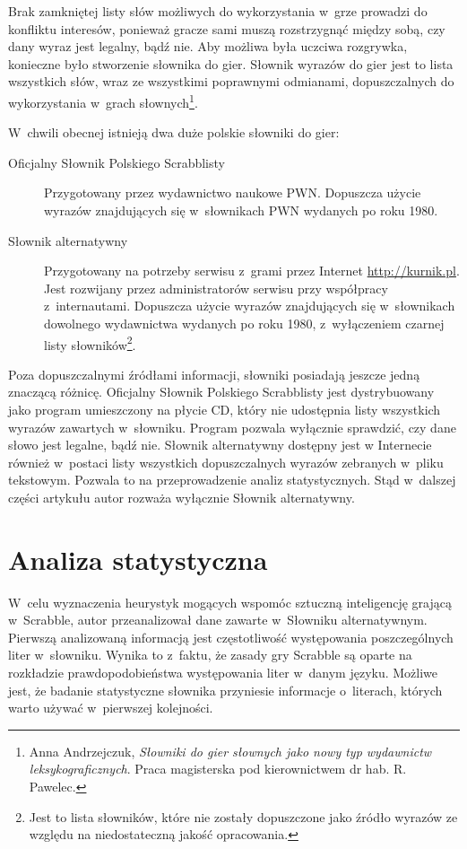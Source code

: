 \documentclass[a4paper,twocolumn,12pt]{article}
\begin{document}
Brak zamkniętej listy słów możliwych do wykorzystania w~grze prowadzi do konfliktu interesów, ponieważ gracze sami muszą rozstrzygnąć między sobą, czy dany wyraz jest legalny, bądź nie. Aby możliwa była uczciwa rozgrywka, konieczne było stworzenie słownika do gier. Słownik wyrazów do gier jest to lista wszystkich słów, wraz ze wszystkimi poprawnymi odmianami, dopuszczalnych do wykorzystania w~grach słownych\footnote{Anna Andrzejczuk, \emph{Słowniki do gier słownych jako nowy typ wydawnictw leksykograficznych}. Praca magisterska pod kierownictwem dr hab. R. Pawelec.}.

W~chwili obecnej istnieją dwa duże polskie słowniki do gier:

\begin{description}
 \item [Oficjalny Słownik Polskiego Scrabblisty] Przygotowany przez wydawnictwo naukowe PWN. Dopuszcza użycie wyrazów znajdujących się w~słownikach PWN wydanych po roku 1980.
 \item[Słownik alternatywny] Przygotowany na potrzeby serwisu z~grami przez Internet \url{http://kurnik.pl}. Jest rozwijany przez administratorów serwisu przy współpracy z~internautami. Dopuszcza użycie wyrazów znajdujących się w~słownikach dowolnego wydawnictwa wydanych po roku 1980, z~wyłączeniem czarnej listy słowników\footnote{Jest to lista słowników, które nie zostały dopuszczone jako źródło wyrazów ze względu na niedostateczną jakość opracowania.}. 
\end{description}

Poza dopuszczalnymi źródłami informacji, słowniki posiadają jeszcze jedną znaczącą różnicę. Oficjalny Słownik Polskiego Scrabblisty jest dystrybuowany jako program umieszczony na płycie CD, który nie udostępnia listy wszystkich wyrazów zawartych w~słowniku. Program pozwala wyłącznie sprawdzić, czy dane słowo jest legalne, bądź nie. Słownik alternatywny dostępny jest w Internecie również w~postaci listy wszystkich dopuszczalnych wyrazów zebranych w~pliku tekstowym. Pozwala to na przeprowadzenie analiz statystycznych. Stąd w~dalszej części artykułu autor rozważa wyłącznie Słownik alternatywny.

\section*{Analiza statystyczna}

W~celu wyznaczenia heurystyk mogących wspomóc sztuczną inteligencję grającą w~Scrabble, autor przeanalizował dane zawarte w~Słowniku alternatywnym. Pierwszą analizowaną informacją jest częstotliwość występowania poszczególnych liter w~słowniku. Wynika to z~faktu, że zasady gry Scrabble są oparte na rozkładzie prawdopodobieństwa występowania liter w~danym języku. Możliwe jest, że badanie statystyczne słownika przyniesie informacje o~literach, których warto używać w~pierwszej kolejności.
\end{document}
